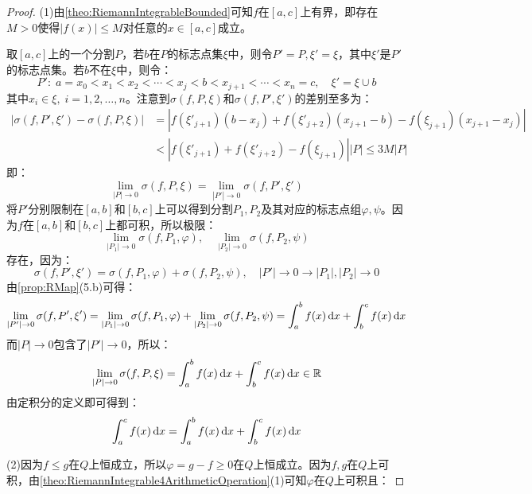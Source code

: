\begin{proof}
	(1)由\cref{theo:RiemannIntegrableBounded}可知$f$在$[a,c]$上有界，即存在$M>0$使得$|f(x)|\leqslant M$对任意的$x\in[a,c]$成立。\par
	取$[a,c]$上的一个分割$P$，若$b$在$P$的标志点集$\xi$中，则令$P'=P,\xi'=\xi$，其中$\xi'$是$P'$的标志点集。若$b$不在$\xi$中，则令：
	\begin{equation*}
		P':\;a=x_0<x_1<x_2<\cdots<x_j<b<x_{j+1}<\cdots<x_n=c,\quad \xi'=\xi\cup{b}
	\end{equation*}
	其中$x_i\in\xi,\;i=1,2,\dots,n$。注意到$\sigma(f,P,\xi)$和$\sigma(f,P',\xi')$的差别至多为：
	\begin{align*}
		|\sigma(f,P',\xi')-\sigma(f,P,\xi)|&=|f(\xi'_{j+1})(b-x_j)+f(\xi'_{j+2})(x_{j+1}-b)-f(\xi_{j+1})(x_{j+1}-x_j)| \\
		&<|f(\xi'_{j+1})+f(\xi'_{j+2})-f(\xi_{j+1})||P|\leqslant3M|P|
	\end{align*}
	即：
	\begin{equation*}
		\lim_{|P|\to0}\sigma(f,P,\xi)=\lim_{|P'|\to0}\sigma(f,P',\xi')
	\end{equation*}
	将$P'$分别限制在$[a,b]$和$[b,c]$上可以得到分割$P_1,P_2$及其对应的标志点组$\varphi,\psi$。因为$f$在$[a,b]$和$[b,c]$上都可积，所以极限：
	\begin{equation*}
		\lim_{|P_1|\to0}\sigma(f,P_1,\varphi),\quad\lim_{|P_2|\to0}\sigma(f,P_2,\psi)
	\end{equation*}
	存在，因为：
	\begin{equation*}
		\sigma(f,P',\xi')=\sigma(f,P_1,\varphi)+\sigma(f,P_2,\psi),\quad|P'|\to0\longrightarrow|P_1|,|P_2|\to0
	\end{equation*}
	由\cref{prop:RMap}(5.b)可得：
	\begin{equation*}
		\lim_{|P'|\to0}\sigma(f,P',\xi')=\lim_{|P_1|\to0}\sigma(f,P_1,\varphi)+\lim_{|P_2|\to0}\sigma(f,P_2,\psi)=\int_{a}^bf(x)\mathop{}\!\mathrm{d} x+\int_{b}^cf(x)\mathop{}\!\mathrm{d} x
	\end{equation*}
	而$|P|\to0$包含了$|P'|\to0$，所以：
	\begin{equation*}
		\lim_{|P|\to0}\sigma(f,P,\xi)=\int_{a}^bf(x)\mathop{}\!\mathrm{d} x+\int_{b}^cf(x)\mathop{}\!\mathrm{d} x\in\mathbb{R}
	\end{equation*}
	由定积分的定义即可得到：
	\begin{equation*}
		\int_{a}^cf(x)\mathop{}\!\mathrm{d} x=\int_{a}^bf(x)\mathop{}\!\mathrm{d} x+\int_{b}^cf(x)\mathop{}\!\mathrm{d} x
	\end{equation*}\par
	(2)因为$f\leqslant g$在$Q$上恒成立，所以$\varphi=g-f\geqslant0$在$Q$上恒成立。因为$f,g$在$Q$上可积，由\cref{theo:RiemannIntegrable4ArithmeticOperation}(1)可知$\varphi$在$Q$上可积且：

\end{proof}
